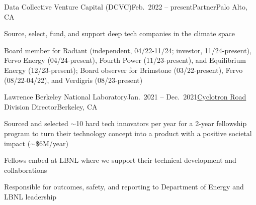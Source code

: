 \begin{rSubsection}{Data Collective Venture Capital (DCVC)}{Feb.\ 2022 -- present}{Partner}{Palo Alto, CA}
\item Source, select, fund, and support deep tech companies in the climate space
\item Board member for Radiant (independent, 04/22-11/24; investor, 11/24-present), Fervo Energy (04/24-present), Fourth Power (11/23-present), and Equilibrium Energy (12/23-present); Board observer for Brimstone (03/22-present), Fervo (08/22-04/22), and Verdigris (08/23-present)
\end{rSubsection}


\begin{rSubsection}{Lawrence Berkeley National Laboratory}{Jan.\ 2021 -- Dec.\ 2021}{\href{https://cyclotronroad.lbl.gov/}{Cyclotron Road} Division Director}{Berkeley, CA}
\item Sourced and selected $\sim$10 hard tech innovators per year for a 2-year fellowship program to turn their technology concept into a product with a positive societal impact ($\sim$\$6M/year) 
\item Fellows embed at LBNL where we support their technical development and collaborations
\item Responsible for outcomes, safety, and reporting to Department of Energy and LBNL leadership
\end{rSubsection}


